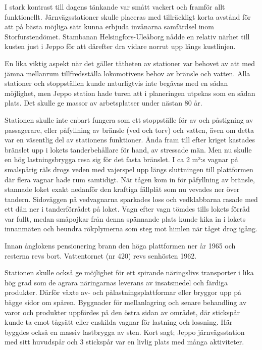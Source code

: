 I stark kontrast till dagens tänkande var smått vackert och framför allt funktionellt. Järnvägsstationer skulle placeras med tillräckligt korta avstånd för att på bästa möjliga sätt kunna erbjuda invånarna samfärdsel inom Storfurstendömet. Stambanan Helsingfors-Uleåborg nådde en relativ närhet till kusten just i Jeppo för att därefter dra vidare norrut upp längs kustlinjen.

En lika viktig aspekt när det gäller tätheten av stationer var behovet av att med jämna mellanrum tillfredsställa lokomotivens behov av bränsle och vatten. Alla stationer och stoppställen kunde naturligtvis inte begåvas med en sådan möjlighet, men Jeppo station hade turen att i planeringen utpekas som en sådan plats. Det skulle ge massor av arbetsplatser under nästan 80 år.

Stationen skulle inte enbart fungera som ett stoppställe för av och påstigning av passagerare, eller påfyllning av bränsle (ved och torv) och vatten, även om detta var en väsentlig del av stationens funktioner. Ända fram till efter kriget kastades bränslet upp i lokets tanderbehållare för hand, av stressade män. Men nu skulle en hög lastningsbrygga resa sig för det fasta bränslet. I ca 2 m³:s vagnar på smalspårig räls drogs veden med vajerspel upp längs sluttningen till plattformen där flera vagnar hade rum samtidigt. När tågen kom in för påfyllning av bränsle, stannade loket exakt nedanför den kraftiga fällplåt som nu vevades ner över tandern. Sidoväggen på vedvagnarna sparkades loss och vedklabbarna rasade med ett dån ner i tanderförrådet på loket. Vagn efter vagn tömdes tills lokets förråd var fullt, medan småpojkar från denna spännande plats kunde kika in i lokets innanmäten och beundra rökplymerna som steg mot himlen när tåget drog igång.

Innan  ånglokens pensionering brann den höga plattformen ner år 1965 och resterna revs bort. Vattentornet (nr 420) revs senhösten 1962.

Stationen skulle också ge möjlighet för ett spirande näringslivs transporter i lika hög grad som de agrara näringarnas leverans av insatsmedel och färdiga produkter. Därför växte av- och pålastningsplattformar eller bryggor upp på bägge sidor om spåren. Byggnader för mellanlagring och senare behandling av varor och produkter uppfördes på den östra sidan av området, där stickspår kunde ta emot tågsätt eller enskilda vagnar för lastning och lossning. Här byggdes också en massiv lastbrygga av sten. Kort sagt; Jeppo järnvägsstation med sitt huvudspår och 3 stickspår var en livlig plats med många aktiviteter.

